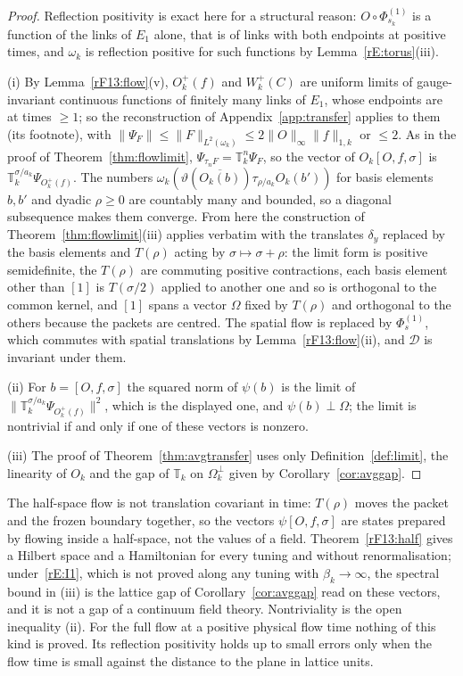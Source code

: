 \begin{proof}
Reflection positivity is exact here for a structural reason: $O\circ
\Phi^{(1)}_{s_k}$ is a function of the links of $E_1$ alone, that is of
links with both endpoints at positive times, and $\omega_k$ is reflection
positive for such functions by Lemma~\ref{rE:torus}(iii).

(i) By Lemma~\ref{rF13:flow}(v), $O^+_k(f)$ and $W^+_k(C)$ are uniform limits of
gauge-invariant continuous functions of finitely many links of $E_1$, whose
endpoints are at times $\ge1$; so the reconstruction of
Appendix~\ref{app:transfer} applies to them (its footnote), with
$\|\Psi_F\|\le\|F\|_{L^2(\omega_k)}\le2\|O\|_\infty\|f\|_{1,k}$ or $\le2$. As in
the proof of Theorem~\ref{thm:flowlimit}, $\Psi_{\tau_nF}=\mathbb T_k^n\Psi_F$, so
the vector of $O_k[O,f,\sigma]$ is $\mathbb T_k^{\sigma/a_k}\Psi_{O^+_k(f)}$.
The numbers $\omega_k(\vartheta(\overline{O_k(b)})\tau_{\rho/a_k}O_k(b'))$ for
basis elements $b,b'$ and dyadic $\rho\ge0$ are countably many and bounded,
so a diagonal subsequence makes them converge. From here the construction
of Theorem~\ref{thm:flowlimit}(iii) applies verbatim with the translates
$\delta_y$ replaced by the basis elements and $T(\rho)$ acting by $\sigma\mapsto
\sigma+\rho$: the limit form is positive semidefinite, the $T(\rho)$ are
commuting positive contractions, each basis element other than $[1]$ is
$T(\sigma/2)$ applied to another one and so is orthogonal to the common kernel,
and $[1]$ spans a vector $\Omega$ fixed by $T(\rho)$ and orthogonal to the
others because the packets are centred. The spatial flow is replaced by
$\Phi^{(1)}_s$, which commutes with spatial translations by
Lemma~\ref{rF13:flow}(ii), and $\mathcal D$ is invariant under them.

(ii) For $b=[O,f,\sigma]$ the squared norm of $\psi(b)$ is the limit of
$\|\mathbb T_k^{\sigma/a_k}\Psi_{O^+_k(f)}\|^2$, which is the displayed one, and $\psi(b)\perp
\Omega$; the limit is nontrivial if and only if one of these vectors is
nonzero.

(iii) The proof of Theorem~\ref{thm:avgtransfer} uses only
Definition~\ref{def:limit}, the linearity of $O_k$ and the gap of $\mathbb
T_k$ on $\Omega_k^\perp$ given by Corollary~\ref{cor:avggap}.
\end{proof}

The half-space flow is not translation covariant in time: $T(\rho)$ moves the
packet and the frozen boundary together, so the vectors $\psi[O,f,\sigma]$ are
states prepared by flowing inside a half-space, not the values of a field.
Theorem~\ref{rF13:half} gives a Hilbert space and a Hamiltonian for every
tuning and without renormalisation; under~\ref{rE:I1}, which is not proved
along any tuning with $\beta_k\to\infty$, the spectral bound in (iii) is
the lattice gap of Corollary~\ref{cor:avggap} read on these vectors, and it
is not a gap of a continuum field theory. Nontriviality is the open
inequality (ii). For the full flow at a
positive physical flow time nothing of this kind is proved. Its
reflection positivity holds up to small errors only when the flow time is
small against the distance to the plane in lattice units.

